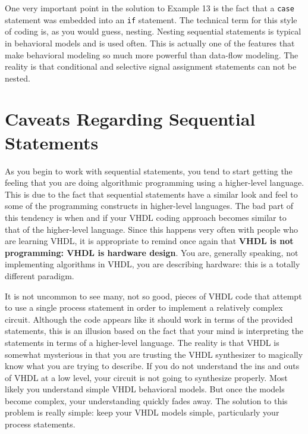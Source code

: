 One very important point in the solution to Example 13 is the fact that a \texttt{case} statement was embedded into an \texttt{if} statement. The technical term for this style of coding is, as you would guess, nesting. Nesting sequential statements is typical in behavioral models and is used often. This is actually one of the features that make behavioral modeling so much more powerful than data-flow modeling. The reality is that conditional and selective signal assignment statements can not be nested.

\section{Caveats Regarding Sequential Statements}
As you begin to work with sequential statements, you tend to start getting the feeling that you are doing algorithmic programming using a higher-level language. This is due to the fact that sequential statements have a similar look and feel to some of the programming constructs in higher-level languages. The bad part of this tendency is when and if your VHDL coding approach becomes similar to that of the higher-level language. Since this happens very often with people who are learning VHDL, it is appropriate to remind once again that \textbf{VHDL is not programming: VHDL is hardware design}. You are, generally speaking, not implementing algorithms in VHDL, you are describing hardware: this is a totally different paradigm.

It is not uncommon to see many, not so good, pieces of VHDL code that attempt to use a single process statement in order to implement a relatively complex circuit. Although the code appears like it should work in terms of the provided statements, this is an illusion based on the fact that your mind is interpreting the statements in terms of a higher-level language. The reality is that VHDL is somewhat mysterious in that you are trusting the VHDL synthesizer to magically know what you are trying to describe. If you do not understand the ins and outs of VHDL at a low level, your circuit is not going to synthesize properly. Most likely you understand simple VHDL behavioral models. But once the models become complex, your understanding quickly fades away. The solution to this problem is really simple: keep your VHDL models simple, particularly your process statements. 

